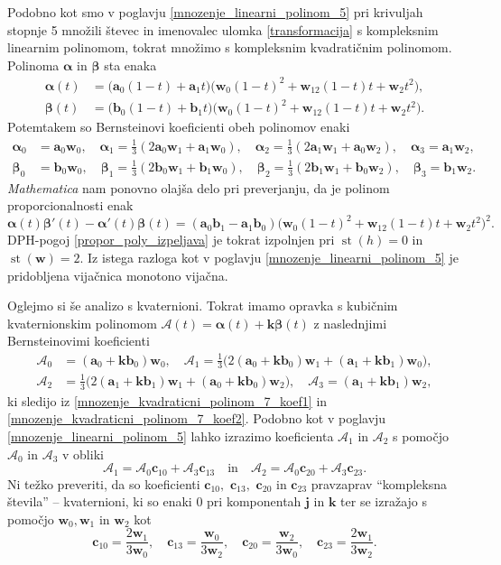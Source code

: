 \documentclass[12pt,a4paper,twoside]{article}
\theoremstyle{definition} %
\theoremstyle{plain} %
\theoremstyle{primerstyle}
\numberwithin{equation}{section}  %
\newcommand{\aV}{\mathbf{a}}
\newcommand{\bV}{\mathbf{b}}
\newcommand{\cV}{\mathbf{c}}
\newcommand{\jV}{\mathbf{j}}
\newcommand{\kV}{\mathbf{k}}
\newcommand{\wV}{\mathbf{w}}
\newcommand{\AQ}{\mathcal{A}}
\newcommand{\balpha}{\boldsymbol \alpha}
\newcommand{\bbeta}{\boldsymbol \beta}
\DeclareMathOperator{\st}{st}
\begin{document}
Podobno kot smo v poglavju \ref{mnozenje_linearni_polinom_5} pri krivuljah stopnje 5 množili števec in imenovalec ulomka \eqref{transformacija} s kompleksnim linearnim polinomom, tokrat množimo s kompleksnim kvadratičnim polinomom. Polinoma $\balpha$ in $\bbeta$ sta enaka
\begin{align}
	\balpha(t)&=\big(\aV_0(1-t)+\aV_1t\big)\big(\wV_0(1-t)^2+\wV_12(1-t)t+\wV_2t^2\big),\nonumber\\
	\bbeta(t)&=\big(\bV_0(1-t)+\bV_1t\big)\big(\wV_0(1-t)^2+\wV_12(1-t)t+\wV_2t^2\big).
\end{align}
Potemtakem so Bernsteinovi koeficienti obeh polinomov enaki
\begin{align}
	\balpha_0&=\aV_0\wV_0,\quad\balpha_1=\frac{1}{3}(2\aV_0\wV_1+\aV_1\wV_0),\quad\balpha_2=\frac{1}{3}(2\aV_1\wV_1+\aV_0\wV_2),\quad\balpha_3=\aV_1\wV_2,\label{mnozenje_kvadraticni_polinom_7_koef1}\\
	\bbeta_0&=\bV_0\wV_0,\quad\bbeta_1=\frac{1}{3}(2\bV_0\wV_1+\bV_1\wV_0),\quad\bbeta_2=\frac{1}{3}(2\bV_1\wV_1+\bV_0\wV_2),\quad\bbeta_3=\bV_1\wV_2.\label{mnozenje_kvadraticni_polinom_7_koef2}
\end{align}
\emph{Mathematica} nam ponovno olajša delo pri preverjanju, da je polinom proporcionalnosti enak
\begin{equation*}
	\balpha(t)\bbeta'(t)-\balpha'(t)\bbeta(t)=(\aV_0\bV_1-\aV_1\bV_0)\big(\wV_0(1-t)^2+\wV_12(1-t)t+\wV_2t^2\big)^2.
\end{equation*}
DPH-pogoj \eqref{propor_poly_izpeljava} je tokrat izpolnjen pri $\st(h)=0$ in $\st(\wV)=2.$ Iz istega razloga kot v poglavju \ref{mnozenje_linearni_polinom_5} je pridobljena vijačnica monotono vijačna.

Oglejmo si še analizo s kvaternioni. Tokrat imamo opravka s kubičnim kvaternionskim polinomom $\AQ(t)=\balpha(t)+\kV\bbeta(t)$ z naslednjimi Bernsteinovimi koeficienti
\begin{align*}
	\AQ_0&=(\aV_0+\kV\bV_0)\wV_0,\quad\AQ_1=\frac{1}{3}\big(2(\aV_0+\kV\bV_0)\wV_1+(\aV_1+\kV\bV_1)\wV_0\big),\\
	\AQ_2&=\frac{1}{3}\big(2(\aV_1+\kV\bV_1)\wV_1+(\aV_0+\kV\bV_0)\wV_2\big),\quad\AQ_3=(\aV_1+\kV\bV_1)\wV_2,
\end{align*}
ki sledijo iz \eqref{mnozenje_kvadraticni_polinom_7_koef1} in \eqref{mnozenje_kvadraticni_polinom_7_koef2}. Podobno kot v poglavju \ref{mnozenje_linearni_polinom_5} lahko izrazimo koeficienta $\AQ_1$ in $\AQ_2$ s pomočjo $\AQ_0$ in $\AQ_3$ v obliki
\begin{equation}
	\AQ_1=\AQ_0\cV_{10}+\AQ_3\cV_{13}\quad\text{in}\quad\AQ_2=\AQ_0\cV_{20}+\AQ_3\cV_{23}.
\end{equation}
Ni težko preveriti, da so koeficienti $\cV_{10},$ $\cV_{13},$ $\cV_{20}$ in $\cV_{23}$ pravzaprav ``kompleksna števila'' -- kvaternioni, ki so enaki 0 pri komponentah $\jV$ in $\kV$ ter se izražajo s pomočjo $\wV_0,\wV_1$ in $\wV_2$ kot
\begin{equation}
	\cV_{10}=\frac{2\wV_1}{3\wV_0},\quad\cV_{13}=\frac{\wV_0}{3\wV_2},\quad\cV_{20}=\frac{\wV_2}{3\wV_0},\quad\cV_{23}=\frac{2\wV_1}{3\wV_2}.
\end{equation}
\end{document}
